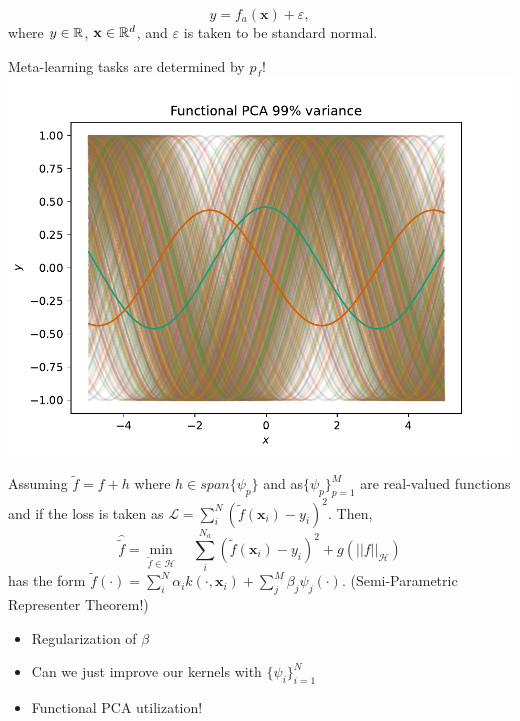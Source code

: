 \documentclass[a0paper,portrait]{baposter}
\begin{document}
\begin{poster}
{}

{
  \begin{equation}\label{eq:data}
  y = f_a(\mathbf{x}) + \varepsilon,
  \end{equation}
where $y\in\mathbb{R}$, $\mathbf{x} \in \mathbb{R}^d$, and $\varepsilon$ is taken to be standard normal.  

\color{Pink} Meta-learning tasks are determined by $p_f$!
\includegraphics[width=\textwidth]{figures/illustration.pdf}
}

{

Assuming $\tilde{f}= f + h$ where $h\in span\{\psi_p\}$ and as$\{\psi_p\}_{p=1}^M$ are real-valued functions and if the loss is taken as $\mathcal{L}=\sum_i^N(\tilde{f}(\mathbf{x}_i)-y_i)^2$. 
Then,
  \begin{equation}
  \hat{\tilde{f}} = \min_{\tilde{f}\in\mathcal{H}}\quad\sum_i^{N_a}(\tilde{f}(\mathbf{x}_i)-y_i)^2 + g(||f||_\mathcal{H})
  \end{equation}  
has the form $\tilde{f}(\cdot)=\sum^N_i\alpha_i k(\cdot,\mathbf{x}_i)+\sum_j^M\beta_j\psi_j(\cdot).$ (Semi-Parametric Representer Theorem!)

}

{
  \begin{itemize}
    \item Regularization of $\beta$ 
    \item Can we just improve our kernels with $\{\psi_i\}_{i=1}^N$
    \item Functional PCA utilization!
  \end{itemize}
}


\end{poster}
\end{document}
